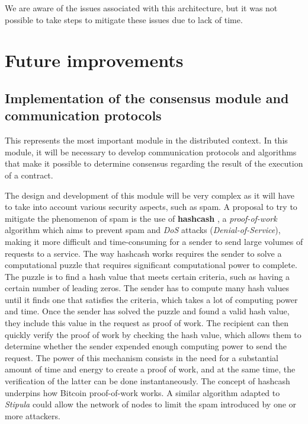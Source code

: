 We are aware of the issues associated with this architecture, but it was not possible to take steps to 
mitigate these issues due to lack of time.

\section{Future improvements}

\subsection{Implementation of the consensus module and communication protocols}

This represents the most important module in the distributed context. In this module, it will be necessary to 
develop communication protocols and algorithms that make it possible to determine consensus regarding the 
result of the execution of a contract.

The design and development of this module will be very complex as it will have to take into account various 
security aspects, such as spam. A proposal to try to mitigate the phenomenon of spam is the use of 
\textbf{hashcash} \autocite{site:hashcash}, a \textit{proof-of-work} algorithm which aims to prevent 
spam and \textit{DoS} attacks (\textit {Denial-of-Service}), making it more difficult and time-consuming 
for a sender to send large volumes of requests to a service. The way hashcash works requires the sender to 
solve a computational puzzle that requires significant computational power to complete. The puzzle is to 
find a hash value that meets certain criteria, such as having a certain number of leading zeros. The sender 
has to compute many hash values until it finds one that satisfies the criteria, which takes a lot of 
computing power and time. Once the sender has solved the puzzle and found a valid hash value, they include 
this value in the request as proof of work. The recipient can then quickly verify the proof of work by 
checking the hash value, which allows them to determine whether the sender expended enough computing power 
to send the request. The power of this mechanism consists in the need for a substantial amount of time and 
energy to create a proof of work, and at the same time, the verification of the latter can be done 
instantaneously. The concept of hashcash underpins how Bitcoin proof-of-work works. A similar algorithm 
adapted to \textit{Stipula} could allow the network of nodes to limit the spam introduced by one or more 
attackers. 

